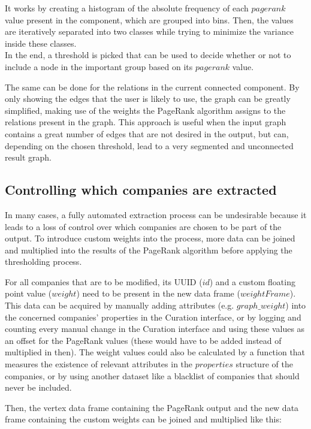 \documentclass[
        a4paper,     %
        titlepage,   %
        oneside,     %
        parskip      %
        ]{scrartcl}  %
\begin{document}
  It works by creating a histogram of the absolute frequency of
  each $pagerank$ value present in the component, which are grouped into bins.
  Then, the values are iteratively separated into two classes while trying to
  minimize the variance inside these classes.\\
  In the end, a threshold is picked that can be used to decide whether or not to
  include a node in the important group based on its $pagerank$ value.

  The same can be done for the relations in the current connected component.
  By only showing the edges that the user is likely to use, the graph can be greatly
  simplified, making use of the weights the PageRank algorithm assigns to the
  relations present in the graph. This approach is useful when the input graph
  contains a great number of edges that are not desired in the output, but can,
  depending on the chosen threshold, lead to a very segmented and unconnected result graph.

  \subsection{Controlling which companies are extracted}
  In many cases, a fully automated extraction process can be undesirable because
  it leads to a loss of control over which companies are chosen to be part of the
  output. To introduce custom weights into the process, more data can be joined and multiplied
  into the results of the PageRank algorithm before applying the thresholding process.

  For all companies that are to be modified, its UUID ($id$) and a custom floating point
  value ($weight$) need to be present in the new data frame ($weightFrame$).
  This data can be acquired by manually adding attributes (e.g. $graph\_weight$)
  into the concerned companies' properties in the Curation interface, or by logging and counting
  every manual change in the Curation interface and using these values as an offset for the
  PageRank values (these would have to be added instead of multiplied in then).
  The weight values could also be calculated by a function that measures the existence
  of relevant attributes in the $properties$ structure of the companies, or by
  using another dataset like a blacklist of companies that should never be included.

  Then, the vertex data frame containing the PageRank output and the new
  data frame containing the custom weights can be joined and multiplied like this:
\end{document}
